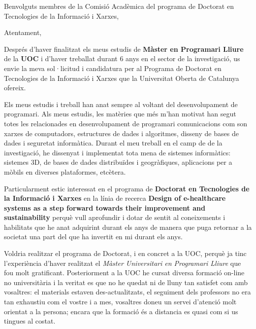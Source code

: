 
%
%


\date{\today}
\opening{Benvolguts membres de la Comisió Acadèmica del programa de Doctorat en Tecnologies de la Informació i Xarxes,}
\closing{Atentament,}




\makelettertitle

Després d'haver finalitzat els meus estudis de \textbf{Màster en Programari Lliure} de la \textbf{UOC} i d'haver treballat durant 6 anys en el sector de la investigació, us envie la meva sol·licitud i candidatura per al Programa de Doctorat en Tecnologies de la Informació i Xarxes que la Universitat Oberta de Catalunya ofereix.

Els meus estudis i treball han anat sempre al voltant del desenvolupament de programari. Als meus estudis, les matèries que més m'han motivat han segut totes les relacionades en desenvolupament de programari comunicacions com son xarxes de computadors, estructures de dades i algoritmes, disseny de bases de dades i seguretat informàtica. Durant el meu treball en el camp de de la investigació, he dissenyat i implementat tota mena de sistemes informàtics: sistemes 3D, de bases de dades distribuïdes i geogràfiques, aplicacions per a mòbils en diverses plataformes, etcètera.

Particularment estic interessat en el programa de \textbf{Doctorat en Tecnologies de la Informació i Xarxes} en la línia de recerca \textbf{Design of e-healthcare systems as a step forward towards their improvement and sustainability} perquè vull aprofundir i dotar de sentit al coneixements i habilitats que he anat adquirint durant els anys de manera que puga retornar a la societat una part del que ha invertit en mi durant els anys.

Voldria realitzar el programa de Doctorat, i en concret a la UOC, perquè ja tinc l'experiència d'haver realitzat el \textit{Màster Universitari en Programari Lliure} que fou molt gratificant. Posteriorment a la UOC he cursat diversa formació on-line no universitària i la veritat es que no he quedat ni de lluny tan satisfet com amb vosaltres: el materials estaven des-actualitzats, el seguiment dels professors no era tan exhaustiu com el vostre i a mes, vosaltres doneu un servei d'atenció molt orientat a la persona; encara que la formació és a distancia es quasi com si us tingues al costat. 


\makeletterclosing

\clearpage